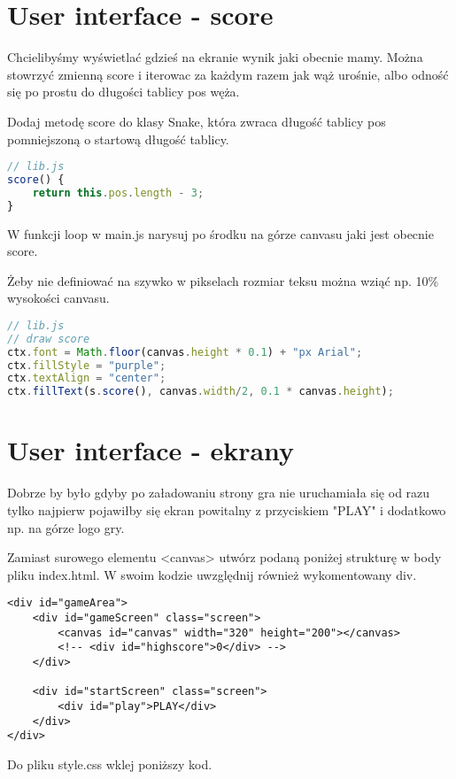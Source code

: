 \documentclass[12pt]{article}
\begin{document}
\section{User interface - score}
Chcielibyśmy wyświetlać gdzieś na ekranie wynik jaki obecnie mamy. Można stowrzyć zmienną score i iterowac za każdym razem jak wąż urośnie, albo odność się po prostu do długości tablicy pos węża.

Dodaj metodę score do klasy Snake, która zwraca długość tablicy pos pomniejszoną o startową długość tablicy.

\begin{lstlisting}[language=JavaScript]
// lib.js
score() {
    return this.pos.length - 3;
}
\end{lstlisting}

W funkcji loop w main.js narysuj po środku na górze canvasu jaki jest obecnie score.

Żeby nie definiować na szywko w pikselach rozmiar teksu można wziąć np. 10\% wysokości canvasu.

\begin{lstlisting}[language=JavaScript]
// lib.js
// draw score
ctx.font = Math.floor(canvas.height * 0.1) + "px Arial";
ctx.fillStyle = "purple";
ctx.textAlign = "center";
ctx.fillText(s.score(), canvas.width/2, 0.1 * canvas.height);
\end{lstlisting}


\section{User interface - ekrany}

Dobrze by było gdyby po załadowaniu strony gra nie uruchamiała się od razu tylko najpierw pojawiłby się ekran powitalny z przyciskiem "PLAY" i dodatkowo np. na górze logo gry.

Zamiast surowego elementu <canvas> utwórz podaną poniżej strukturę w body pliku index.html. W swoim kodzie uwzględnij również wykomentowany div.

\begin{verbatim}
<div id="gameArea">
    <div id="gameScreen" class="screen">
        <canvas id="canvas" width="320" height="200"></canvas>
        <!-- <div id="highscore">0</div> -->
    </div>

    <div id="startScreen" class="screen">
        <div id="play">PLAY</div>
    </div>
</div>
\end{verbatim} 

Do pliku style.css wklej poniższy kod.
\end{document}

